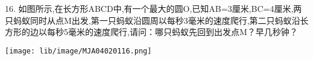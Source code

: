 16.	如图所示,在长方形ABCD中,有一个最大的圆O,已知AB=3厘米,BC=4厘米,两只蚂蚁同时从点M出发,第一只蚂蚁沿圆周以每秒3毫米的速度爬行,第二只蚂蚁沿长方形的边以每秒5毫米的速度爬行,请问：哪只蚂蚁先回到出发点M？早几秒钟？

\begin{flushright}

    \texttt{[image: lib/image/MJA04020116.png]}

\end{flushright}



